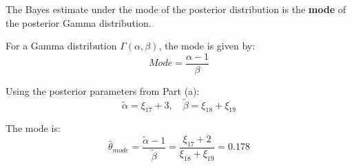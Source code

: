 The Bayes estimate under the mode of the posterior distribution is the \textbf{mode} of the posterior Gamma distribution. 

For a Gamma distribution $ \Gamma(\alpha, \beta) $, the mode is given by:
\begin{equation}
Mode = \frac{\alpha - 1}{\beta}
\end{equation}

Using the posterior parameters from Part (a):
\begin{equation}
\tilde{\alpha} = \xi_{17} + 3, \quad \tilde{\beta} = \xi_{18} + \xi_{19}
\end{equation}

The mode is:
\begin{equation}
\hat{\theta}_{mode} = \frac{\tilde{\alpha} - 1}{\tilde{\beta}} = \frac{\xi_{17} + 2}{\xi_{18} + \xi_{19}}=0.178
\end{equation}

